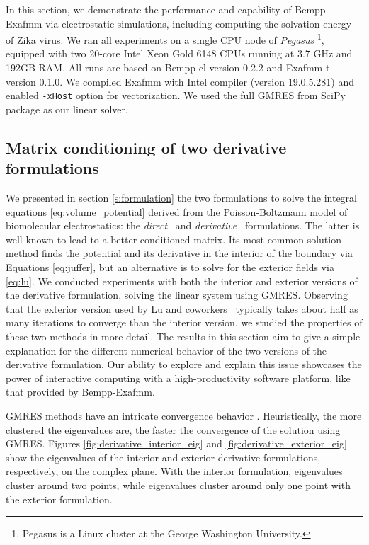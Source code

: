 In this section, we demonstrate the performance and capability of Bempp-Exafmm via electrostatic simulations, including computing the solvation energy of Zika virus.
We ran all experiments on a single CPU node of \textit{Pegasus} \footnote{Pegasus is a Linux cluster at the George Washington University.}, equipped with two 20-core Intel Xeon Gold 6148 CPUs running at 3.7 GHz and 192GB RAM.
All runs are based on Bempp-cl version 0.2.2 and Exafmm-t version 0.1.0.
We compiled Exafmm with Intel compiler (version 19.0.5.281) and enabled \texttt{-xHost} option for vectorization.
We used the full GMRES from SciPy package as our linear solver.

\subsection{Matrix conditioning of two derivative formulations}

We presented in section \ref{s:formulation} the two formulations to solve the integral equations  \eqref{eq:volume_potential} derived from the Poisson-Boltzmann model of biomolecular electrostatics: 
the \emph{direct}~\cite{YoonLenhoff1990}  and \emph{derivative}~\cite{JufferETal1991} formulations.
The latter is well-known to lead to a better-conditioned matrix.
Its most common solution method finds the potential and its derivative in the interior of the boundary via Equations \eqref{eq:juffer}, but an alternative is to solve for the exterior fields via \eqref{eq:lu}.
We conducted experiments with both the interior and exterior versions of the derivative formulation, solving the linear system using GMRES.
Observing that the exterior version used by Lu and coworkers~\cite{LuETal2006,LuETal2009,ZhangETal2019} typically takes about half as many iterations to converge than the interior version, we studied the properties of these two methods in more detail.
The results in this section aim to give a simple explanation for the different numerical behavior of the two versions of the derivative formulation.
Our ability to explore and explain this issue showcases the power of interactive computing with a high-productivity software platform, like that provided by Bempp-Exafmm.

GMRES methods have an intricate convergence behavior \cite{mark1999a}.
Heuristically, the more clustered the eigenvalues are, the faster the convergence of the solution using GMRES.
Figures \ref{fig:derivative_interior_eig} and \ref{fig:derivative_exterior_eig} show the eigenvalues of the interior and exterior derivative formulations, respectively, on the complex plane.
With the interior formulation, eigenvalues cluster around two points, while eigenvalues cluster around only one point with the exterior formulation.

